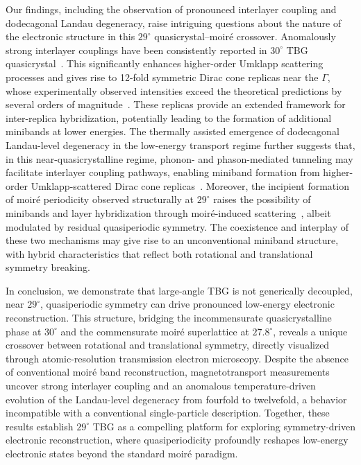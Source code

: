 \documentclass[reprint,
superscriptaddress,amsmath,amssymb,aps,prl]{revtex4-2}
\begin{document}
Our findings, including the observation of pronounced interlayer coupling and dodecagonal Landau degeneracy, raise intriguing questions about the nature of the electronic structure in this $29^\circ$ quasicrystal--moir\'{e} crossover. Anomalously strong interlayer couplings have been consistently reported in $30^\circ$ TBG quasicrystal~\cite{ahn2018dirac}. This significantly enhances higher-order Umklapp scattering processes and gives rise to 12-fold symmetric Dirac cone replicas near the $\Gamma$, whose experimentally observed intensities exceed the theoretical predictions by several orders of magnitude~\cite{ahn2018dirac}. These replicas provide an extended framework for inter-replica hybridization, potentially leading to the formation of additional minibands at lower energies. The thermally assisted emergence of dodecagonal Landau-level degeneracy in the low-energy transport regime further suggests that, in this near-quasicrystalline regime, phonon- and phason-mediated tunneling may facilitate interlayer coupling pathways, enabling miniband formation from higher-order Umklapp-scattered Dirac cone replicas~\cite{ochoa2019moire, samajdar2022moire, ochoa2022degradation}. Moreover, the incipient formation of moir\'{e} periodicity observed structurally at $29^\circ$ raises the possibility of minibands and layer hybridization through moir\'{e}-induced scattering~\cite{hamer2022moire}, albeit modulated by residual quasiperiodic symmetry. The coexistence and interplay of these two mechanisms may give rise to an unconventional miniband structure, with hybrid characteristics that reflect both rotational and translational symmetry breaking.


In conclusion, we demonstrate that large-angle TBG is not generically decoupled, near $29^\circ$, quasiperiodic symmetry can drive pronounced low-energy electronic reconstruction. This structure, bridging the incommensurate quasicrystalline phase at $30^\circ$ and the commensurate moir\'{e} superlattice at $27.8^\circ$, reveals a unique crossover between rotational and translational symmetry, directly visualized through atomic-resolution transmission electron microscopy. Despite the absence of conventional moir\'{e} band reconstruction, magnetotransport measurements uncover strong interlayer coupling and an anomalous temperature-driven evolution of the Landau-level degeneracy from fourfold to twelvefold, a behavior incompatible with a conventional single-particle description. Together, these results establish $29^\circ$ TBG as a compelling platform for exploring symmetry-driven electronic reconstruction, where quasiperiodicity profoundly reshapes low-energy electronic states beyond the standard moir\'{e} paradigm.\\
\end{document}

